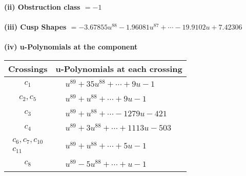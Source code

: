 \documentclass[1p]{elsarticle_modified}
\theoremstyle{definition}
\begin{document}
\flushleft \textbf{(ii) Obstruction class $= -1$}\\~\\
\flushleft \textbf{(iii) Cusp Shapes $= -3.67855 u^{88}-1.96081 u^{87}+\cdots-19.9102 u+7.42306$}\\~\\
\newpage\renewcommand{\arraystretch}{1}
\flushleft \textbf{(iv) u-Polynomials at the component}\newline \\
\begin{tabular}{m{50pt}|m{274pt}}
Crossings & \hspace{64pt}u-Polynomials at each crossing \\
\hline $$\begin{aligned}c_{1}\end{aligned}$$&$\begin{aligned}
&u^{89}+35 u^{88}+\cdots+9 u-1
\end{aligned}$\\
\hline $$\begin{aligned}c_{2},c_{5}\end{aligned}$$&$\begin{aligned}
&u^{89}+u^{88}+\cdots+9 u-1
\end{aligned}$\\
\hline $$\begin{aligned}c_{3}\end{aligned}$$&$\begin{aligned}
&u^{89}+u^{88}+\cdots-1279 u-421
\end{aligned}$\\
\hline $$\begin{aligned}c_{4}\end{aligned}$$&$\begin{aligned}
&u^{89}+3 u^{88}+\cdots+1113 u-503
\end{aligned}$\\
\hline $$\begin{aligned}c_{6},c_{7},c_{10}\\c_{11}\end{aligned}$$&$\begin{aligned}
&u^{89}+u^{88}+\cdots+5 u-1
\end{aligned}$\\
\hline $$\begin{aligned}c_{8}\end{aligned}$$&$\begin{aligned}
&u^{89}-5 u^{88}+\cdots+u-1
\end{aligned}$\\

\end{tabular}
\end{document}
